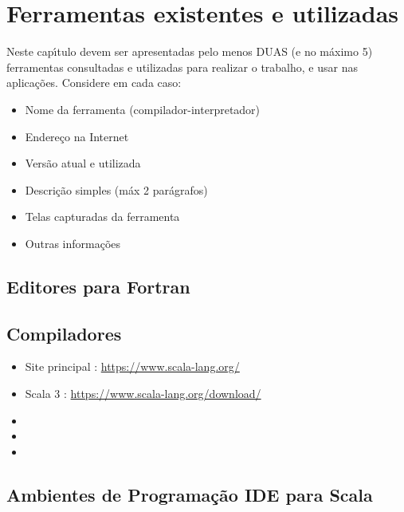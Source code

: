 


\chapter{Ferramentas existentes e utilizadas}

Neste cap\'{\i}tulo devem ser apresentadas pelo menos DUAS (e no m\'{a}ximo 5) ferramentas consultadas e utilizadas para realizar o trabalho, e usar nas aplica\c{c}\~{o}es. Considere em cada caso:
\begin{itemize}
  \item Nome da ferramenta (compilador-interpretador)
  \item Endere\c{c}o na Internet
  \item Vers\~{a}o atual e utilizada
  \item Descri\c{c}\~{a}o simples (m\'{a}x 2 par\'{a}grafos)
  \item Telas capturadas da ferramenta
  \item Outras informa\c{c}\~{o}es
\end{itemize}


    \section{Editores para Fortran}


    \section{Compiladores}
            \begin{itemize}
              \item Site principal : \url{https://www.scala-lang.org/}
              \item Scala 3 : \url{https://www.scala-lang.org/download/}
              \item
              \item
              \item
            \end{itemize}



    \section{Ambientes de Programa\c{c}\~{a}o IDE para Scala}
